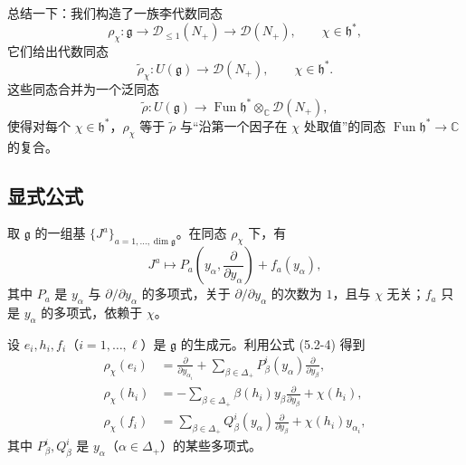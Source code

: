 总结一下：我们构造了一族李代数同态
\[
    \rho_\chi:\mathfrak{g}\to\mathcal{D}_{\le1}(N_+)\to\mathcal{D}(N_+),
    \qquad\chi\in\mathfrak{h}^*,
\]
它们给出代数同态
\[
    \widetilde{\rho}_\chi:U(\mathfrak{g})\to\mathcal{D}(N_+),
    \qquad\chi\in\mathfrak{h}^*.
\]
这些同态合并为一个泛同态
\begin{equation}
    \widetilde{\rho}:U(\mathfrak{g})\to\operatorname{Fun}\mathfrak{h}^*\otimes_{\mathbb{C}}\mathcal{D}(N_+),
    \tag{5.2-10}
\end{equation}
使得对每个 $\chi\in\mathfrak{h}^*$，$\rho_\chi$ 等于 $\widetilde{\rho}$ 与“沿第一个因子在 $\chi$ 处取值”的同态 $\operatorname{Fun}\mathfrak{h}^*\to\mathbb{C}$ 的复合。

\subsection{显式公式}

取 $\mathfrak{g}$ 的一组基 $\{J^a\}_{a=1,\ldots,\dim\mathfrak{g}}$。在同态 $\rho_\chi$ 下，有
\begin{equation}
    J^a\mapsto P_a\left(y_\alpha,\frac{\partial}{\partial y_\alpha}\right)+f_a(y_\alpha),
    \tag{5.2-11}
\end{equation}
其中 $P_a$ 是 $y_\alpha$ 与 $\partial/\partial y_\alpha$ 的多项式，关于 $\partial/\partial y_\alpha$ 的次数为 $1$，且与 $\chi$ 无关；$f_a$ 只是 $y_\alpha$ 的多项式，依赖于 $\chi$。

设 $e_i,h_i,f_i$（$i=1,\ldots,\ell$）是 $\mathfrak{g}$ 的生成元。利用公式 (5.2-4) 得到
\begin{align}
    \rho_\chi(e_i)&=\frac{\partial}{\partial y_{\alpha_i}}
        +\sum_{\beta\in\Delta_+}P_\beta^i(y_\alpha)\frac{\partial}{\partial y_\beta},
        \tag{5.2-12}\\
    \rho_\chi(h_i)&=-\sum_{\beta\in\Delta_+}\beta(h_i)y_\beta
        \frac{\partial}{\partial y_\beta}+\chi(h_i),
        \tag{5.2-13}\\
    \rho_\chi(f_i)&=\sum_{\beta\in\Delta_+}Q_\beta^i(y_\alpha)\frac{\partial}{\partial y_\beta}
        +\chi(h_i)y_{\alpha_i},
        \tag{5.2-14}
\end{align}
其中 $P_\beta^i,Q_\beta^i$ 是 $y_\alpha$（$\alpha\in\Delta_+$）的某些多项式。


